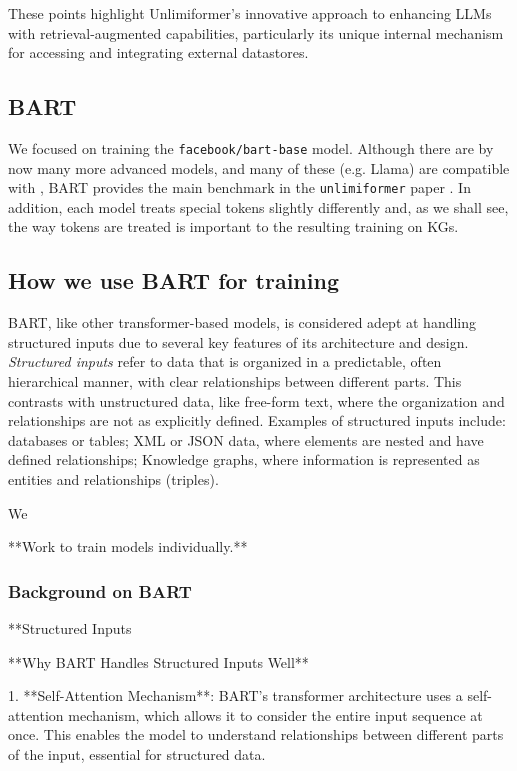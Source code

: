 \documentclass[12pt]{article}
\begin{document}
These points highlight Unlimiformer's innovative approach to enhancing LLMs with retrieval-augmented capabilities, particularly its unique internal mechanism for accessing and integrating external datastores.

\subsection*{BART} We focused on training the \texttt{facebook/bart-base}
model. Although there are by now many more advanced models, and many of these
(e.g. Llama) are compatible with , BART provides the main
benchmark in the \texttt{unlimiformer} paper \cite{bertsch2023unlimiformer}.
In addition, each model treats special tokens slightly differently and, as we
shall see, the way tokens are treated is important to the resulting training on
KGs.

\subsection{How we use BART for training}
BART, like other transformer-based models, is considered adept at handling
structured inputs due to several key features of its architecture and design.
\emph{Structured inputs} refer to data that is organized in a predictable,
often hierarchical manner, with clear relationships between different parts.
This contrasts with unstructured data, like free-form text, where the
organization and relationships are not as explicitly defined. Examples of
structured inputs include: databases or tables; XML or JSON data, where
elements are nested and have defined relationships; Knowledge graphs, where
information is represented as entities and relationships (triples).

We 


**Work to train models individually.**
\subsubsection{Background on BART}

**Structured Inputs



**Why BART Handles Structured Inputs Well**

1. **Self-Attention Mechanism**: BART's transformer architecture uses a self-attention mechanism, which allows it to consider the entire input sequence at once. This enables the model to understand relationships between different parts of the input, essential for structured data.
\end{document}
